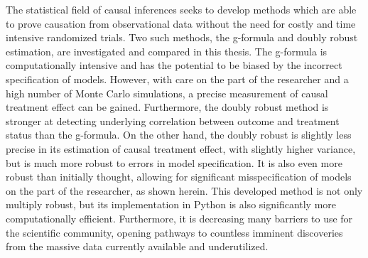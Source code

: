 
The statistical field of causal inferences seeks to develop methods which are able to prove causation from observational data without the need for costly and time intensive randomized trials.  Two such methods, the g-formula and doubly robust estimation, are investigated and compared in this thesis.  The g-formula is computationally intensive and has the potential to be biased by the incorrect specification of models.  However, with care on the part of the researcher and a high number of Monte Carlo simulations, a precise measurement of causal treatment effect can be gained.  Furthermore, the doubly robust method is stronger at detecting underlying correlation between outcome and treatment status than the g-formula.  On the other hand, the doubly robust is slightly less precise in its estimation of causal treatment effect, with slightly higher variance, but is much more robust to errors in model specification.  It is also even more robust than initially thought, allowing for significant misspecification of models on the part of the researcher, as shown herein.   This developed method is not only multiply robust, but its implementation in Python is also significantly more computationally efficient.  Furthermore, it is decreasing many barriers to use for the scientific community, opening pathways to countless imminent discoveries from the massive data currently available and underutilized.  